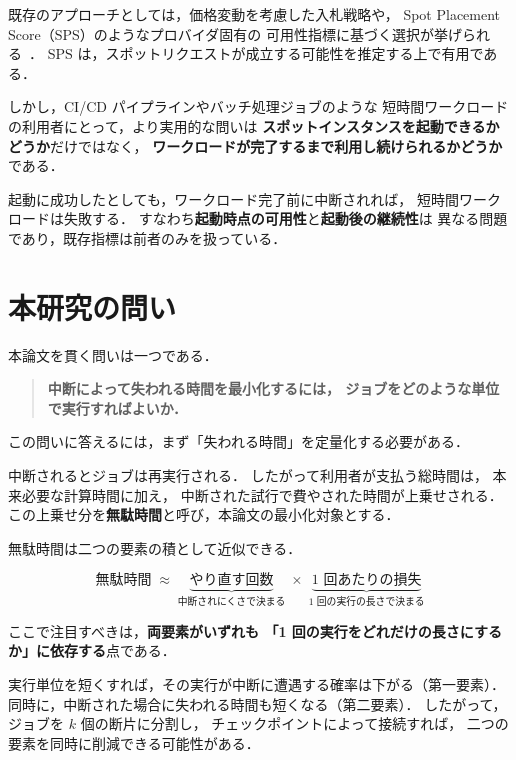 \documentclass[11pt,a4paper]{ltjsreport}
\begin{document}
既存のアプローチとしては，価格変動を考慮した入札戦略や，
Spot Placement Score（SPS）のようなプロバイダ固有の
可用性指標に基づく選択が挙げられる~\cite{Garg2025,Katayama2022}．
SPS は，スポットリクエストが成立する可能性を推定する上で有用である．

しかし，CI/CD パイプラインやバッチ処理ジョブのような
短時間ワークロードの利用者にとって，より実用的な問いは
\textbf{スポットインスタンスを起動できるかどうか}だけではなく，
\textbf{ワークロードが完了するまで利用し続けられるかどうか}である．

起動に成功したとしても，ワークロード完了前に中断されれば，
短時間ワークロードは失敗する．
すなわち\textbf{起動時点の可用性}と\textbf{起動後の継続性}は
異なる問題であり，既存指標は前者のみを扱っている．

\section{本研究の問い}
\label{sec:question}

本論文を貫く問いは一つである．

\begin{quote}
\textbf{中断によって失われる時間を最小化するには，
ジョブをどのような単位で実行すればよいか．}
\end{quote}

この問いに答えるには，まず「失われる時間」を定量化する必要がある．

中断されるとジョブは再実行される．
したがって利用者が支払う総時間は，
本来必要な計算時間に加え，
中断された試行で費やされた時間が上乗せされる．
この上乗せ分を\textbf{無駄時間}と呼び，本論文の最小化対象とする．

無駄時間は二つの要素の積として近似できる．

\begin{equation}
\text{無駄時間} \;\approx\;
\underbrace{\text{やり直す回数}}_{\text{中断されにくさで決まる}}
\;\times\;
\underbrace{\text{1 回あたりの損失}}_{\text{1 回の実行の長さで決まる}}
\label{eq:intro_waste}
\end{equation}

ここで注目すべきは，\textbf{両要素がいずれも
「1 回の実行をどれだけの長さにするか」に依存する}点である．

実行単位を短くすれば，その実行が中断に遭遇する確率は下がる（第一要素）．
同時に，中断された場合に失われる時間も短くなる（第二要素）．
したがって，ジョブを $k$ 個の断片に分割し，
チェックポイントによって接続すれば，
二つの要素を同時に削減できる可能性がある．
\end{document}
